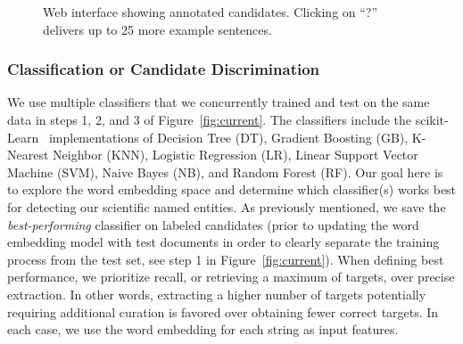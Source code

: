 \begin{figure}
\centering
{}
\caption{\label{fig:polyner} Web interface showing annotated candidates.
Clicking on ``?'' delivers up to 25 more example sentences.
}
\end{figure}

\subsubsection{Classification or Candidate Discrimination}
We use multiple classifiers that we concurrently trained and test on the same data in steps 1, 2, and 3 of Figure~\ref{fig:current}.
The classifiers include the scikit-Learn~\cite{scikit-learn} implementations of Decision Tree (DT), Gradient Boosting (GB), K-Nearest Neighbor (KNN), Logistic Regression (LR), Linear Support Vector Machine (SVM), Naive Bayes (NB), and Random Forest (RF). 
Our goal here is to explore the word embedding space and determine which classifier(s) works best for detecting our scientific named entities.
As previously mentioned, we save the \textit{best-performing} classifier on labeled candidates (prior to updating the word embedding model  with test documents in order to clearly separate the training process from the test set, see step 1 in Figure~\ref{fig:current}).
When defining best performance, we prioritize recall, or retrieving a maximum of targets, over precise extraction.
In other words, extracting a higher number of targets potentially requiring additional curation is favored over obtaining fewer correct targets.
In each case, we use the word embedding for each string as input features.





